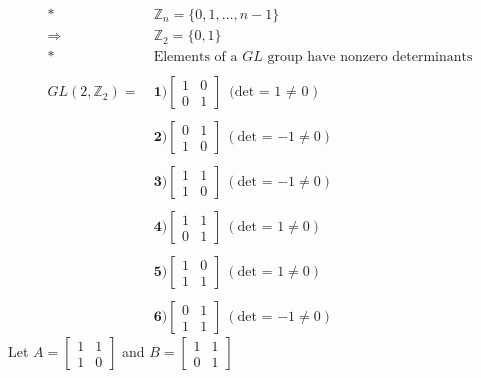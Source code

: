 \documentclass[12pt, letterpaper]{article}
\begin{document}
\begin{align*}
    * \ &\mathbb{Z}_{n} = \{0, 1, ..., n-1\} \\
    \Rightarrow \ &\mathbb{Z}_{2} = \{0, 1\} \\ 
    * \ &\text{Elements of a $GL$ group have nonzero determinants} \\ \\
    GL(2, \mathbb{Z}_{2}) = \ & \textbf{1)} \left[\begin{array}{cc}
         1&0  \\
         0&1 
    \end{array}\right] \ \text{(det = 1 $\neq$ 0}) \\ \\
    &\textbf{2)} \left[\begin{array}{cc}
         0&1  \\
         1&0 
    \end{array}\right] \ (\text{det = $-1 \neq 0$}) \\ \\
    &\textbf{3)} \left[\begin{array}{cc}
        1 & 1 \\
        1 &0 
    \end{array}\right] \ (\text{det = $-1 \neq 0$}) \\ \\
    &\textbf{4)} \left[\begin{array}{cc}
         1&1  \\
         0&1 
    \end{array}\right] \ (\text{det = $1 \neq 0$}) \\ \\
    &\textbf{5)} \left[\begin{array}{cc}
        1 & 0 \\
        1 & 1
    \end{array}\right] \ (\text{det = $1 \neq 0$}) \\ \\
    &\textbf{6)} \left[\begin{array}{cc}
        0 & 1 \\
        1 & 1
    \end{array}\right] \ (\text{det = $-1 \neq 0$})
\end{align*}
\indent Let $A = \left[\begin{array}{cc} 
        1 & 1 \\
        1 &0 
    \end{array}\right]$ and $B = \left[\begin{array}{cc}
         1&1  \\
         0&1 
    \end{array}\right]$ \\
\end{document}

